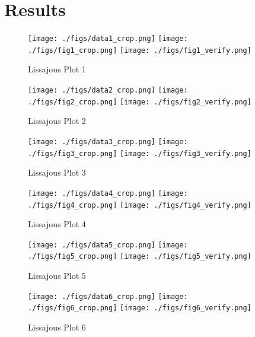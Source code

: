 \documentclass[12pt]{article}
\begin{document}
\section{Results}
\begin{figure*}[ht!]
    {\texttt{[image: ./figs/data1\_crop.png]}}
    \hspace{\fill}
    {\texttt{[image: ./figs/fig1\_crop.png]}}
    \hspace{\fill}
    {\texttt{[image: ./figs/fig1\_verify.png]}}\\
    \caption{Lissajous Plot 1}
\end{figure*}
\begin{figure*}[ht!]
    {\texttt{[image: ./figs/data2\_crop.png]}}
    \hspace{\fill}
    {\texttt{[image: ./figs/fig2\_crop.png]}}
    \hspace{\fill}
    {\texttt{[image: ./figs/fig2\_verify.png]}}\\
    \caption{Lissajous Plot 2}
\end{figure*}\begin{figure*}[ht!]
    {\texttt{[image: ./figs/data3\_crop.png]}}
    \hspace{\fill}
    {\texttt{[image: ./figs/fig3\_crop.png]}}
    \hspace{\fill}
    {\texttt{[image: ./figs/fig3\_verify.png]}}\\
    \caption{Lissajous Plot 3}
\end{figure*}\begin{figure*}[ht!]
    {\texttt{[image: ./figs/data4\_crop.png]}}
    \hspace{\fill}
    {\texttt{[image: ./figs/fig4\_crop.png]}}
    \hspace{\fill}
    {\texttt{[image: ./figs/fig4\_verify.png]}}\\
    \caption{Lissajous Plot 4}
\end{figure*}\begin{figure*}[ht!]
    {\texttt{[image: ./figs/data5\_crop.png]}}
    \hspace{\fill}
    {\texttt{[image: ./figs/fig5\_crop.png]}}
    \hspace{\fill}
    {\texttt{[image: ./figs/fig5\_verify.png]}}\\
    \caption{Lissajous Plot 5}
\end{figure*}
\begin{figure*}[ht!]
    {\texttt{[image: ./figs/data6\_crop.png]}}
    \hspace{\fill}
    {\texttt{[image: ./figs/fig6\_crop.png]}}
    \hspace{\fill}
    {\texttt{[image: ./figs/fig6\_verify.png]}}\\
    \caption{Lissajous Plot 6}
\end{figure*}
\end{document}
